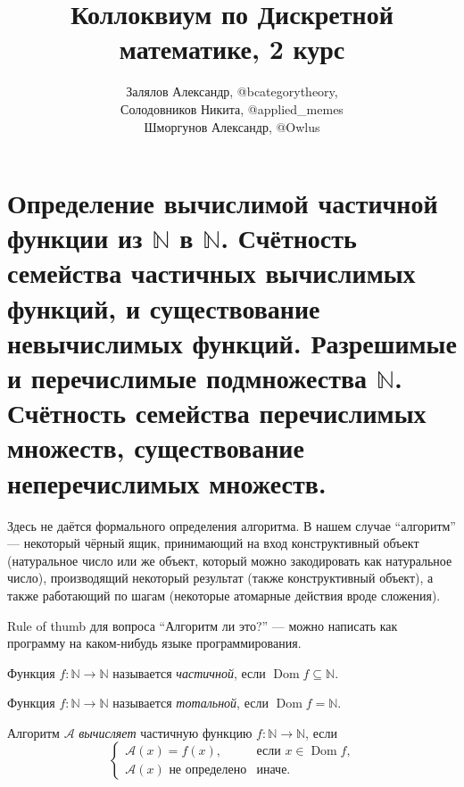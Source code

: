 \documentclass{article}
\title{Коллоквиум по Дискретной математике, 2 курс}
\author{Залялов Александр, @bcategorytheory,\\  Солодовников Никита, @applied\_memes \\ Шморгунов Александр, @Owlus }
\date{}
\begin{document}
    \maketitle

    \tableofcontents

    \clearpage

    \section{Определение вычислимой частичной функции из $\mathbb{N}$ в $\mathbb{N}$.
    Счётность семейства частичных вычислимых функций, и существование невычислимых функций.
    Разрешимые и перечислимые подмножества $\mathbb{N}$. Счётность семейства перечислимых множеств,
    существование неперечислимых множеств.}

    Здесь не даётся формального определения алгоритма. В нашем случае ``алгоритм'' --- некоторый
    чёрный ящик, принимающий на вход конструктивный объект (натуральное число или же объект, который
    можно закодировать как натуральное число), производящий некоторый результат (также конструктивный
    объект), а также работающий по шагам (некоторые атомарные действия вроде сложения).

    Rule of thumb для вопроса ``Алгоритм ли это?'' --- можно написать как программу на каком-нибудь
    языке программирования.

    \begin{definition}
        Функция $f: \mathbb{N} \to \mathbb{N}$ называется \textit{частичной}, если $\operatorname{Dom} f \subseteq \mathbb{N}$.
    \end{definition}

    \begin{definition}
        Функция $f: \mathbb{N} \to \mathbb{N}$ называется \textit{тотальной}, если $\operatorname{Dom} f = \mathbb{N}.$
    \end{definition}

    \begin{definition}
        Алгоритм $\mathcal{A}$ \textit{вычисляет} частичную функцию $f: \mathbb{N} \to \mathbb{N}$, если
        $$
            \begin{cases}
                \mathcal{A}(x) = f(x), & \text{если $x \in \operatorname{Dom} f$,}\\
                \mathcal{A}(x) \text{ не определено} & \text{иначе.}
            \end{cases}
        $$
    \end{definition}
\end{document}

